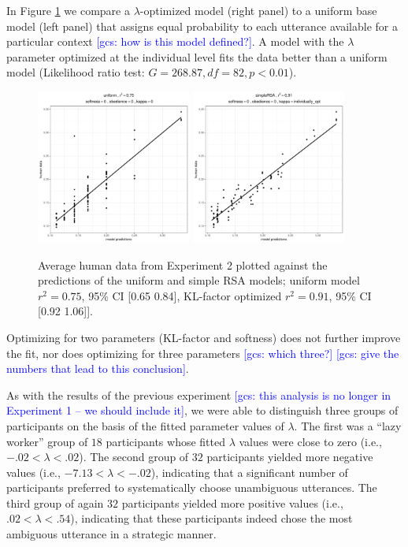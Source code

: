 \documentclass[10pt,a4paper]{article}
\newcommand{\gcs}[1]{\textcolor{blue}{[gcs: #1]}}
\begin{document}
In Figure \ref{kl-factor} we compare a $\lambda$-optimized model (right panel) to a uniform base model (left panel) that assigns equal probability to each utterance available for a particular context \gcs{how is this model defined?}. A model with the $\lambda$ parameter optimized at the individual level fits the data better than a uniform model  (Likelihood ratio test: $G = 268.87, df = 82, p <0.01$). 
\begin{figure}[ht]
	\centering
	\includegraphics[width=2in]{images/x3_m20.pdf}
	\includegraphics[width=2in]{images/x3_m11.pdf}
	\caption{Average human data from Experiment 2 plotted against the predictions of the uniform and simple RSA models; uniform model  $r^{2}=0.75$, 95\% CI [0.65 0.84], KL-factor optimized  $r^{2}=0.91$, 95\% CI [0.92 1.06]]. }\label{kl-factor}
\end{figure}
Optimizing for two parameters (KL-factor and softness) does not further improve the fit, %
nor does optimizing for three parameters \gcs{which three?} \gcs{give the numbers that lead to this conclusion}. %

As with the results of the previous experiment \gcs{this analysis is no longer in Experiment 1 -- we should include it}, we were able to distinguish three groups of participants on the basis of the fitted parameter values of $\lambda$. 
The first was a ``lazy worker'' group of $18$ participants whose fitted $\lambda$ values were close to zero (i.e.,  $-.02 < \lambda<.02$).
The second group of $32$ participants yielded more negative values (i.e., $-7.13<\lambda<-.02$), indicating that a significant number of participants preferred to systematically choose unambiguous utterances. 
The third group of again $32$ participants yielded more positive values (i.e., $.02<\lambda<.54$), indicating that these participants indeed chose the most ambiguous utterance in a strategic manner. 
\end{document}
